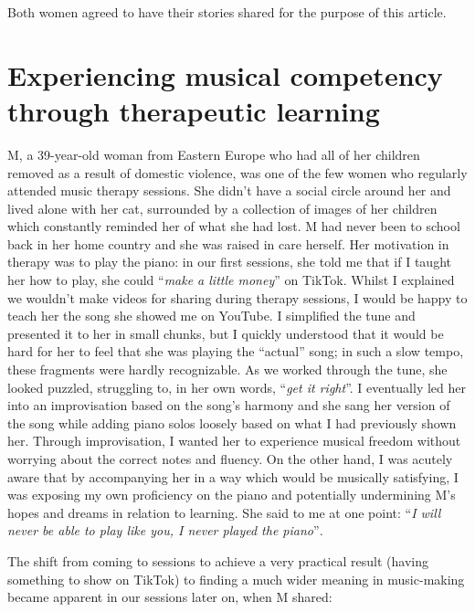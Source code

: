 \documentclass[authordate, empirical]{jote-new-article}
\begin{document}
	Both women agreed to have their stories shared for the purpose of this article.







	\section{Experiencing musical competency through therapeutic learning}







	M, a 39-year-old woman from Eastern Europe who had all of her children removed as a result of domestic violence, was one of the few women who regularly attended music therapy sessions. She didn't have a social circle around her and lived alone with her cat, surrounded by a collection of images of her children which constantly reminded her of what she had lost. M had never been to school back in her home country and she was raised in care herself. Her motivation in therapy was to play the piano: in our first sessions, she told me that if I taught her how to play, she could “\emph{make a little money}” on TikTok. Whilst I explained we wouldn't make videos for sharing during therapy sessions, I would be happy to teach her the song she showed me on YouTube. I simplified the tune and presented it to her in small chunks, but I quickly understood that it would be hard for her to feel that she was playing the “actual” song; in such a slow tempo, these fragments were hardly recognizable. As we worked through the tune, she looked puzzled, struggling to, in her own words, “\emph{get it right}”. I eventually led her into an improvisation based on the song's harmony and she sang her version of the song while adding piano solos loosely based on what I had previously shown her. Through improvisation, I wanted her to experience musical freedom without worrying about the correct notes and fluency. On the other hand, I was acutely aware that by accompanying her in a way which would be musically satisfying, I was exposing my own proficiency on the piano and potentially undermining M's hopes and dreams in relation to learning. She said to me at one point: “\emph{I will never be able to play like you, I never played the piano}”\emph{.}







	The shift from coming to sessions to achieve a very practical result (having something to show on TikTok) to finding a much wider meaning in music-making became apparent in our sessions later on, when M shared:
\end{document}
